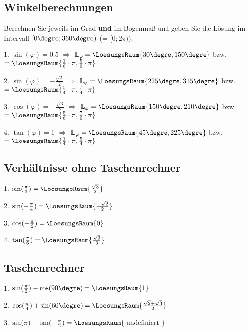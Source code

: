 \platzFuerBerechnungenBisEndeSeite{}
\newpage


\subsection{Winkelberechnungen}

Berechnen Sie jeweils im Grad \textbf{und} im Bogenmaß und geben Sie
die Lösung im Intervall $[0\degre; 360\degre)$ (= $[0; 2\pi)$):

1. $\sin(\varphi) = 0.5$ $\Longrightarrow$
$\mathbb{L}_\varphi = \LoesungsRaum{30\degre, 150\degre}$ bzw. $= \LoesungsRaum{ \frac16\cdot{}\pi{}, \frac56\cdot{}\pi}$

2. $\sin(\varphi) = -\frac{\sqrt{2}}{2}$ $\Longrightarrow$
$\mathbb{L}_\varphi = \LoesungsRaum{225\degre, 315\degre}$ bzw. $= \LoesungsRaum{ \frac54\cdot{}\pi{}, \frac74\cdot{}\pi}$


3. $\cos(\varphi) = -\frac{\sqrt{3}}{2}$ $\Longrightarrow$
$\mathbb{L}_\varphi = \LoesungsRaum{150\degre, 210\degre}$ bzw. $= \LoesungsRaum{ \frac56\cdot{}\pi{}, \frac76\cdot{}\pi}$

4. $\tan(\varphi) = 1$ $\Longrightarrow$
$\mathbb{L}_\varphi = \LoesungsRaum{45\degre, 225\degre}$ bzw. $= \LoesungsRaum{ \frac14\cdot{}\pi{}, \frac54\cdot{}\pi}$

\subsection{Verhältnisse ohne Taschenrechner}

1. $\sin(\frac{\pi}3) = \LoesungsRaum{\frac{\sqrt{3}}2}$

2. $\sin(-\frac{\pi}4) = \LoesungsRaum{\frac{-\sqrt{2}}2}$

3. $\cos(-\frac{\pi}2) = \LoesungsRaum{0}$

4. $\tan(\frac{\pi}6) = \LoesungsRaum{\frac{\sqrt{3}}3}$

\platzFuerBerechnungenBisEndeSeite{}
\newpage


\subsection{Taschenrechner}

1. $\sin(\frac{\pi}2) -\cos(90\degre) = \LoesungsRaum{1}$

2. $\cos(\frac\pi4) + \sin(60\degre) = \LoesungsRaum{\frac{\sqrt{2}+\sqrt{3}}2}$

3. $\sin(\pi) - \tan(-\frac{\pi}2) = \LoesungsRaum{\textrm{ undefiniert }}$

\platzFuerBerechnungenBisEndeSeite{}


  
